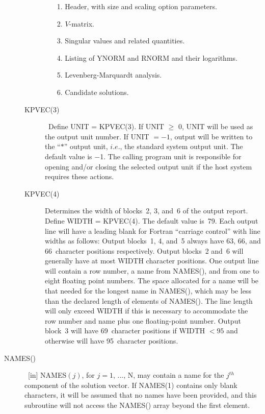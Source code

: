 \documentclass[twoside]{MATH77}
\begin{document}
\begin{description}
\begin{description}
\begin{itemize}
\item[1.]  Header, with size and scaling option parameters.

\item[2.]  $V$-matrix.

\item[3.]  Singular values and related quantities.

\item[4.]  Listing of YNORM and RNORM and their logarithms.

\item[5.]  Levenberg-Marquardt analysis.

\item[6.]  Candidate solutions.
\end{itemize}

\item[KPVEC(3)] \ Define UNIT = KPVEC(3). If UNIT $\geq $ 0, UNIT will be
used as the output unit number. If UNIT $=-1$, output will be written to
the ``$\ast $'' output unit, $i.e.$, the standard system output unit.
The default value is $-$1. The calling program unit is responsible for
opening and/or closing the selected output unit if the host system
requires these actions.

\item[KPVEC(4)] Determines the width of blocks~2, 3, and~6 of the output report.
Define WIDTH = KPVEC(4). The default value is~79. Each output line will have
a leading blank for Fortran ``carriage control'' with line widths as
follows: Output blocks~1, 4, and~5 always have 63, 66, and 66~character
positions respectively. Output blocks~2 and~6 will generally have at most
WIDTH character positions. One output line will contain a row number, a name
from NAMES(), and from one to eight floating point numbers. The space
allocated for a name will be that needed for the longest name in NAMES(),
which may be less than the declared length of elements of NAMES(). The line
length will only exceed WIDTH if this is necessary to accommodate the row
number and name plus one floating-point number. Output block~3 will have
69~character positions if WIDTH $<95$ and otherwise will have 95~character
positions.
\end{description}

\item[NAMES()]  \ [in] NAMES$(j)$, for $j=1$, ..., N, may contain a name for
the $j^{th}$ component of the solution vector. If NAMES(1) contains only
blank characters, it will be assumed that no names have been provided, and
this subroutine will not access the NAMES() array beyond the first element.


\end{description}
\end{document}
